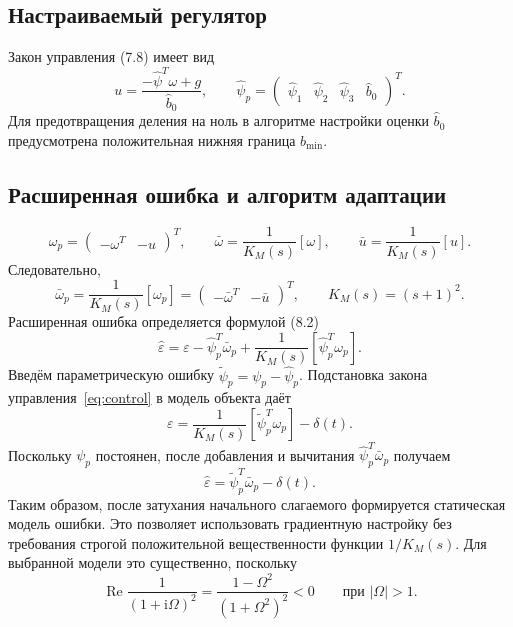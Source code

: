 \subsection{Настраиваемый регулятор}

Закон управления (7.8) имеет вид
\begin{equation}
  u=\frac{-\hat{\psi}^{T}\omega+g}{\hat b_0},
  \qquad
  \hat{\psi}_p=
  \begin{pmatrix}
    \hat\psi_1&\hat\psi_2&\hat\psi_3&\hat b_0
  \end{pmatrix}^{T}.
  \label{eq:control}
\end{equation}
Для предотвращения деления на ноль в алгоритме настройки
оценки $\hat b_0$ предусмотрена положительная нижняя граница
$b_{\min}$.

\subsection{Расширенная ошибка и алгоритм адаптации}

\begin{equation}
  \omega_p=
  \begin{pmatrix}-\omega^{T}&-u\end{pmatrix}^{T},
  \qquad
  \bar\omega=\frac{1}{K_M(s)}[\omega],
  \qquad
  \bar u=\frac{1}{K_M(s)}[u].
  \label{eq:filtered-regressor}
\end{equation}
Следовательно,
\begin{equation}
  \bar\omega_p=\frac{1}{K_M(s)}[\omega_p]
  =\begin{pmatrix}-\bar\omega^{T}&-\bar u\end{pmatrix}^{T},
  \qquad K_M(s)=(s+1)^2.
\end{equation}
Расширенная ошибка определяется формулой (8.2)
\begin{equation}
  \hat\varepsilon
  =\varepsilon-\hat\psi_p^{T}\bar\omega_p
  +\frac{1}{K_M(s)}
    \left[\hat\psi_p^{T}\omega_p\right].
  \label{eq:augmented-error}
\end{equation}
Введём параметрическую ошибку
$\tilde\psi_p=\psi_p-\hat\psi_p$. Подстановка закона
управления~\eqref{eq:control} в модель объекта даёт
\begin{equation}
  \varepsilon
  =\frac{1}{K_M(s)}[\tilde\psi_p^{T}\omega_p]-\delta(t).
  \label{eq:dynamic-error}
\end{equation}
Поскольку $\psi_p$ постоянен, после добавления и вычитания
$\hat\psi_p^{T}\bar\omega_p$ получаем
\begin{equation}
  \hat\varepsilon
  =\tilde\psi_p^{T}\bar\omega_p-\delta(t).
  \label{eq:static-error}
\end{equation}
Таким образом, после затухания начального слагаемого
формируется статическая модель ошибки. Это позволяет использовать
градиентную настройку без требования строгой положительной
вещественности функции $1/K_M(s)$.
Для выбранной модели это существенно, поскольку
\begin{equation}
  \operatorname{Re}\frac{1}{(1+\mathrm{i}\Omega)^2}
  =\frac{1-\Omega^2}{(1+\Omega^2)^2}<0
  \qquad\text{при }|\Omega|>1.
\end{equation}

